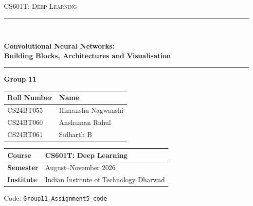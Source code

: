 \documentclass[11pt,a4paper]{article}
\newcommand{\code}[1]{\texttt{#1}}
\begin{document}
\begin{titlepage}
\centering
\vspace*{1em}
{\large\scshape CS601T: Deep Learning\par}\vspace{0.2em}{\normalsize Programming Assignment 5\par}
\vspace{1.2em}\rule{\linewidth}{1.0pt}\\[0.6em]
{\LARGE\bfseries Convolutional Neural Networks:\\[0.2em] Building Blocks, Architectures and Visualisation\par}
\vspace{0.6em}\rule{\linewidth}{1.0pt}\vspace{2.4em}
{\large\bfseries Group 11\par}\vspace{0.8em}
\begin{tabular}{@{}ll@{}}
\toprule\textbf{Roll Number} & \textbf{Name} \\ \midrule
CS24BT055 & Himanshu Nagwanshi \\
CS24BT060 & Anshuman Rahul \\
CS24BT061 & Sidharth B \\
\bottomrule
\end{tabular}
\vspace{2.4em}
\begin{tabular}{@{}ll@{}}
\toprule\textbf{Course} & CS601T: Deep Learning \\ \midrule
\textbf{Semester} & August--November 2026 \\
\textbf{Institute} & Indian Institute of Technology Dharwad \\
\bottomrule
\end{tabular}
\vfill
{\small Code: \code{Group11\_Assignment5\_code}\par}
\vspace{1em}
\end{titlepage}

\begin{abstract}
\noindent
Part~A builds a convolutional network for a five-class MNIST subset (digits 0, 4, 5, 6, 7) one
block at a time: a single Kaiming-initialised $5\times5$ filter applied by explicit traversal, a
convolution--ReLU--max-pool layer class stacked twice, and the full network trained with SGD.  The
trained network reaches 99.42\,\% test accuracy (22 errors in
3795).  Part~B trains three CNNs from scratch on a five-class Caltech-101 subset
($224\times224$ colour images, 250 training images).  All three fit their training set almost
perfectly (97.2--99.6\,\%) while reaching 74.0--78.0\,\% validation accuracy; the
5-layer Arch-2 is selected on validation and scores 68.0\,\% on the test set; rerunning the
whole procedure with five seeds finds no evidence that one architecture is better (70.0--71.6\,\% mean
test accuracy).  An
ImageNet-pretrained VGG19 with only its classification layer retrained scores
100.0\,\% on the same test set.  Every network is also examined from the inside:
filters, feature maps, the input patches that maximally activate a neuron, guided
backpropagation and Grad-CAM.
\end{abstract}
\end{document}
